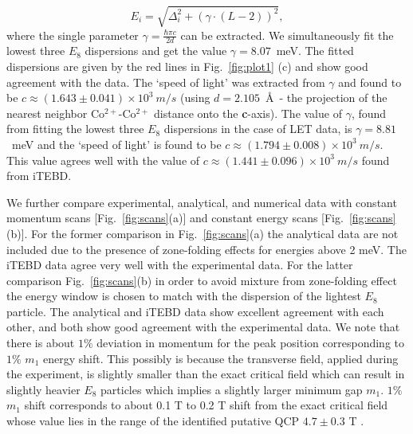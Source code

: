 \documentclass[aps,prl,twocolumn,superscriptaddress,groupedaddress]{revtex4}
\begin{document}
\begin{equation}
E_i=\sqrt{\Delta_i^2+\left(\gamma\cdot(L-2)\right)^2},
\label{eu_eqn}
\end{equation}
where the single parameter $\gamma=\frac{\hbar \pi c}{2d}$ can be extracted. We simultaneously fit the lowest three $E_8$ dispersions and get the value $\gamma=8.07$~meV. The fitted dispersions are given by the red lines in Fig.~\ref{fig:plot1} (c) and show good agreement with the data. The `speed of light' was extracted from $\gamma$ and found to be $c \approx (1.643 \pm 0.041)\times 10^{3}~m/s$ (using $d=2.105$~\AA\ - the projection of the nearest neighbor Co$^{2+}$-Co$^{2+}$ distance onto the {\bf c}-axis). The value of $\gamma$, found from fitting the lowest three $E_8$ dispersions in the case of LET data, is $\gamma=8.81$~meV and the `speed of light' is found to be $c \approx (1.794 \pm 0.008)\times 10^{3}~m/s$. This value agrees well with the value of $c \approx (1.441 \pm 0.096)\times 10^{3}~m/s$ found from iTEBD. 

We further compare experimental, analytical, and numerical data with 
constant momentum scans [Fig.~\ref{fig:scans}(a)] and constant energy scans
[Fig.~\ref{fig:scans} (b)]. For the former comparison in Fig.~\ref{fig:scans}(a) 
the analytical data are not included due to the presence of zone-folding effects for energies above 2 meV. The iTEBD data agree very well with the experimental data. For the latter comparison Fig.~\ref{fig:scans}(b) in order to avoid mixture from zone-folding effect the energy window is chosen to match with the dispersion of the lightest $E_8$ particle.
The analytical and iTEBD data show excellent agreement 
with each other, and both show good agreement with the experimental data. We note
that there is about $1\%$ deviation in momentum for the peak position
corresponding to $1\%$ $m_1$ energy shift. This possibly is because the transverse field, applied during the experiment, is slightly smaller than the exact critical field which can result in
slightly heavier $E_8$ particles which implies a slightly larger
minimum gap $m_1$. $1\%$ $m_1$ shift corresponds to about 0.1 T to
0.2 T shift from the exact critical field whose value lies in the range of the identified
putative QCP $4.7 \pm 0.3$ T \cite{Zou_2021}.

\par
\end{document}
